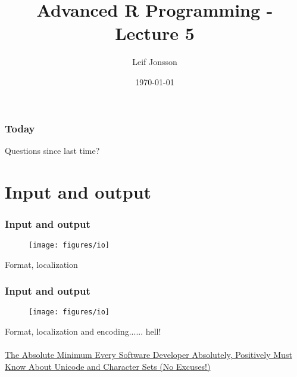 \documentclass{beamer}
\title[Lecture 5]{Advanced R Programming - Lecture 5} %
\author{Leif Jonsson} %
\institute[STIMA LiU] %
{
Link\"{o}ping University \\ %
\medskip
\textit{leif.jonsson@ericsson.com\\leif.r.jonsson@liu.se} %
}
\date{\today} %
\begin{document}
\begin{frame}
\titlepage %
\end{frame}

\begin{frame}
\frametitle{Today} %
\tableofcontents %
\end{frame}


\begin{frame}
	\Huge{\centerline{Questions since last time?}}
\end{frame}

\section{Input and output}

\begin{frame}
	\frametitle{Input and output}
	\begin{center}
	\begin{figure}
		\texttt{[image: figures/io]}
		\label{fig:io}
	\end{figure}
	Format, localization
	\end{center}
\end{frame}

\begin{frame}
	\frametitle{Input and output}
	\begin{center}
	\begin{figure}
		\texttt{[image: figures/io]}
		\label{fig:io}
	\end{figure}
	Format, localization and encoding...... hell! \\~\\
	\href{http://www.joelonsoftware.com/articles/Unicode.html}{The Absolute 
	Minimum Every Software Developer Absolutely, Positively Must Know About 
	Unicode and Character Sets (No Excuses!)}
\end{center}
\end{frame}
\end{document}
